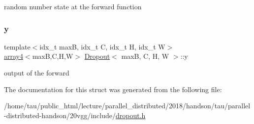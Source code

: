 random number state at the forward function \mbox{\label{structDropout_ad758df2bfbd791e6b25e29c8204e0df4}} 
\subsubsection{\texorpdfstring{y}{y}}
{\footnotesize\ttfamily template$<$idx\+\_\+t maxB, idx\+\_\+t C, idx\+\_\+t H, idx\+\_\+t W$>$ \\
\hyperlink{structarray4}{array4}$<$maxB,C,H,W$>$ \hyperlink{structDropout}{Dropout}$<$ maxB, C, H, W $>$\+::y}

output of the forward 

The documentation for this struct was generated from the following file\+:\begin{DoxyCompactItemize}
\item 
/home/tau/public\+\_\+html/lecture/parallel\+\_\+distributed/2018/handson/tau/parallel-\/distributed-\/handson/20vgg/include/\hyperlink{dropout_8h}{dropout.\+h}\end{DoxyCompactItemize}
